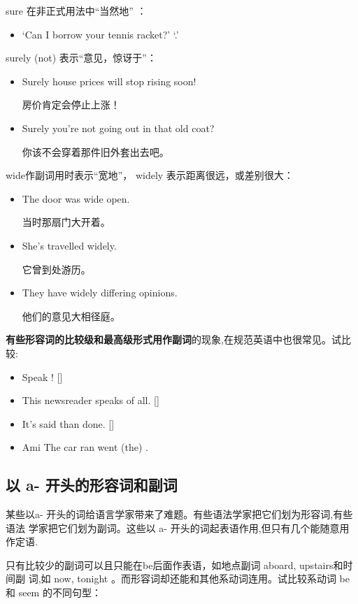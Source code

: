 sure 在非正式用法中“当然地” ：
\begin{itemize}
\item `Can I borrow your tennis racket?' `.'
\end{itemize}

surely (not) 表示“意见，惊讶于”：
\begin{itemize}
\item Surely house prices will stop rising soon!

  房价肯定会停止上涨！
\item Surely you're not going out in that old coat?

  你该不会穿着那件旧外套出去吧。
\end{itemize}

wide作副词用时表示“宽地”， widely 表示距离很远，或差别很大：
\begin{itemize}
\item The door was wide open.

  当时那扇门大开着。
\item She's travelled widely.

  它曾到处游历。
\item They have widely differing opinions.

  他们的意见大相径庭。
\end{itemize}


\textbf{有些形容词的比较级和最高级形式用作副词}的现象,在规范英语中也很常见。试比较:
\begin{itemize}
\item Speak ! []
\item This newsreader speaks  of all. []
\item It's  said than done. []
\item Ami The car ran went (the) .
\end{itemize}

\subsection{以 a- 开头的形容词和副词}

某些以a- 开头的词给语言学家带来了难题。有些语法学家把它们划为形容词,有些语法
学家把它们划为副词。这些以 a- 开头的词起表语作用,但只有几个能随意用作定语.

只有比较少的副词可以且只能在be后面作表语，如地点副词 aboard, upstairs和时间副
词,如 now, tonight 。而形容词却还能和其他系动词连用。试比较系动词 be 和 seem
的不同句型：

